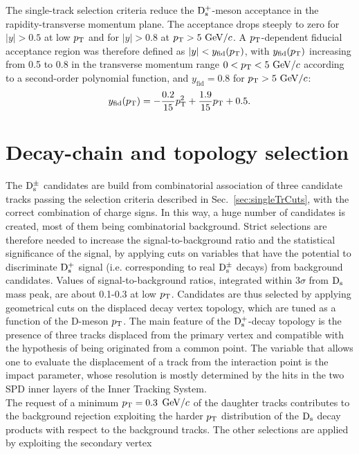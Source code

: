 The single-track selection criteria reduce the ${\rm D_s^+}$-meson acceptance
in the rapidity-transverse momentum plane. The acceptance drops 
steeply to zero for $|y| > 0.5$ at low $p_{\rm T}$ and for $|y| > 0.8$ 
at $p_{\rm T} > 5~\mathrm{GeV}/c$. A $p_{\rm T}$-dependent fiducial acceptance region was therefore defined as 
$|y| < y_{\mathrm{fid}}(p_{\rm T})$, with $y_{\mathrm{fid}}(p_{\rm T})$ increasing 
from 0.5 to 0.8 in the transverse momentum range $0 < p_{\rm T} < 5~\mathrm{GeV}/c$ 
according to a second-order polynomial function, and $y_{\mathrm{fid}}=0.8$ 
for $p_{\rm T} > 5~\mathrm{GeV}/c$:
\begin{equation}
\label{eq:yFid}
y_{\rm fid} (p_{\rm T}) = -\frac{0.2}{15}p_{\rm T}^2 + \frac{1.9}{15}p_{\rm T} + 0.5.
\end{equation}

\section{Decay-chain and topology selection}
\label{sec:topolPP}
The ${\rm D_s^{\pm}}$ candidates are build from combinatorial 
 association of three candidate tracks passing the selection criteria 
 described in Sec.~\ref{sec:singleTrCuts}, with the correct combination of charge 
 signs. In this way, a huge number of candidates is created, most of them 
 being combinatorial background. Strict selections are therefore needed to increase
 the signal-to-background ratio and the statistical significance of the signal,
 by applying cuts on variables that have the potential to discriminate
 ${\rm D_s^+}$ signal (i.e. corresponding to real ${\rm D_s^{\pm}}$ decays) 
 from background candidates. Values of signal-to-background ratios, integrated within
 3$\sigma$ from ${\rm D_s}$ mass peak, are about 0.1-0.3 at low $p_{\rm T}$. Candidates 
  are thus selected by applying geometrical cuts on the displaced decay vertex 
  topology, which are tuned as a function of the D-meson $p_{\rm T}$.
The main feature of the ${\rm D_s^+}$-decay topology is the presence of three tracks displaced from 
the primary vertex and compatible with the hypothesis of being originated from 
a common point. 
The variable that allows one to evaluate the displacement of a track from the interaction point is the 
impact parameter, whose resolution is mostly determined by the hits in the 
two SPD inner layers of the Inner Tracking System. \\
The request of a minimum $p_{\rm T} = 0.3$ $\mathrm{GeV}/c$ of the daughter tracks contributes to 
the background rejection exploiting the harder  $p_{\rm T}$ distribution of
the ${\rm D_s}$ decay products with respect to the background tracks. 
The other selections are applied by exploiting the secondary vertex
